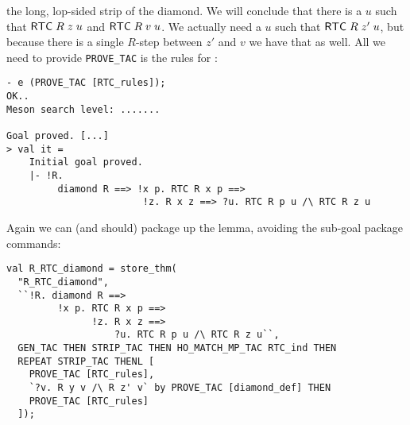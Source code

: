 the long, lop-sided strip of the diamond.  We will conclude that there
is a $u$ such that ${\sf RTC}\;R\;z\;u$ and ${\sf RTC}\;R\;v\;u$.  We
actually need a $u$ such that ${\sf RTC}\;R\;z'\;u$, but because there
is a single $R$-step between $z'$ and $v$ we have that as well.  All
we need to provide \texttt{PROVE\_TAC} is the rules for :
\begin{session}\begin{verbatim}
- e (PROVE_TAC [RTC_rules]);
OK..
Meson search level: .......

Goal proved. [...]
> val it =
    Initial goal proved.
    |- !R.
         diamond R ==> !x p. RTC R x p ==>
                        !z. R x z ==> ?u. RTC R p u /\ RTC R z u
\end{verbatim}\end{session}
    Again we can (and should) package up the lemma, avoiding the
    sub-goal package commands:
\begin{session}\begin{verbatim}
val R_RTC_diamond = store_thm(
  "R_RTC_diamond",
  ``!R. diamond R ==>
         !x p. RTC R x p ==>
               !z. R x z ==>
                   ?u. RTC R p u /\ RTC R z u``,
  GEN_TAC THEN STRIP_TAC THEN HO_MATCH_MP_TAC RTC_ind THEN
  REPEAT STRIP_TAC THENL [
    PROVE_TAC [RTC_rules],
    `?v. R y v /\ R z' v` by PROVE_TAC [diamond_def] THEN
    PROVE_TAC [RTC_rules]
  ]);
\end{verbatim}\end{session}
\eos{}

